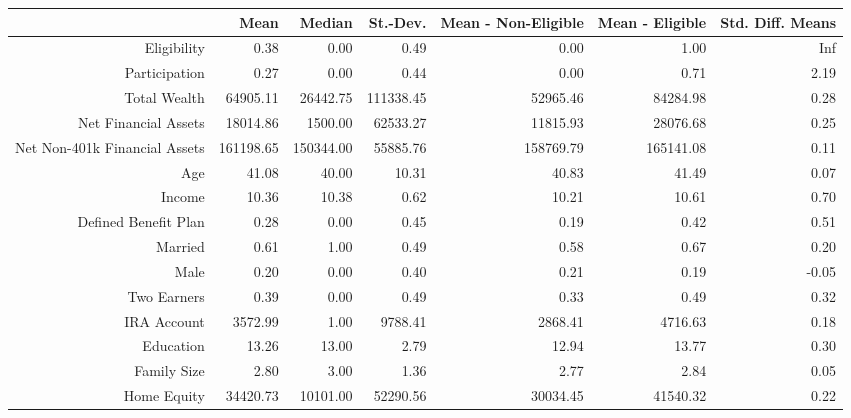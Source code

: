 \documentclass[10pt,a4paper]{article}
\begin{document}
\begin{table}[ht]
\centering
\begin{tabular}{rrrrrrr}
  \hline
 & Mean & Median & St.-Dev. & Mean - Non-Eligible & Mean - Eligible & Std. Diff. Means \\ 
  \hline
Eligibility & 0.38 & 0.00 & 0.49 & 0.00 & 1.00 & Inf \\ 
  Participation & 0.27 & 0.00 & 0.44 & 0.00 & 0.71 & 2.19 \\ 
  Total Wealth & 64905.11 & 26442.75 & 111338.45 & 52965.46 & 84284.98 & 0.28 \\ 
  Net Financial Assets & 18014.86 & 1500.00 & 62533.27 & 11815.93 & 28076.68 & 0.25 \\ 
  Net Non-401k Financial Assets & 161198.65 & 150344.00 & 55885.76 & 158769.79 & 165141.08 & 0.11 \\ 
  Age & 41.08 & 40.00 & 10.31 & 40.83 & 41.49 & 0.07 \\ 
  Income & 10.36 & 10.38 & 0.62 & 10.21 & 10.61 & 0.70 \\ 
  Defined Benefit Plan & 0.28 & 0.00 & 0.45 & 0.19 & 0.42 & 0.51 \\ 
  Married & 0.61 & 1.00 & 0.49 & 0.58 & 0.67 & 0.20 \\ 
  Male & 0.20 & 0.00 & 0.40 & 0.21 & 0.19 & -0.05 \\ 
  Two Earners & 0.39 & 0.00 & 0.49 & 0.33 & 0.49 & 0.32 \\ 
  IRA Account& 3572.99 & 1.00 & 9788.41 & 2868.41 & 4716.63 & 0.18 \\ 
  Education & 13.26 & 13.00 & 2.79 & 12.94 & 13.77 & 0.30 \\ 
  Family Size & 2.80 & 3.00 & 1.36 & 2.77 & 2.84 & 0.05 \\ 
  Home Equity & 34420.73 & 10101.00 & 52290.56 & 30034.45 & 41540.32 & 0.22 \\ 
   \hline
\end{tabular}
\end{table}
\end{document}
